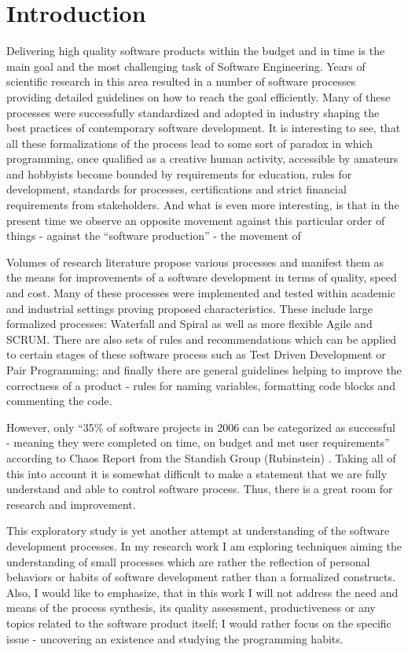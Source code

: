 \chapter{Introduction}
Delivering high quality software products within the budget and in time is the main goal and the most 
challenging task of Software Engineering. Years of scientific research in
this area resulted in a number of software processes providing detailed guidelines on how to reach 
the goal efficiently. Many of these processes were successfully standardized and adopted 
in industry shaping the best practices of contemporary software development. 
It is interesting to see, that all these formalizations of the process lead to some sort of paradox 
in which programming, once qualified as a creative human activity, accessible by amateurs 
and hobbyists become bounded by requirements for education, rules for development, standards for 
processes, certifications and strict financial requirements from stakeholders. And what is even more 
interesting, is that in the present time we observe an opposite movement against this particular order 
of things - against the ``software production'' - the movement of 

Volumes of research literature propose various processes and manifest them as the 
means for improvements of a software development in terms of quality, speed and cost. 
Many of these processes were implemented and tested within academic and industrial 
settings proving proposed characteristics. These include large formalized processes: 
Waterfall and Spiral as well as more flexible Agile and SCRUM. 
There are also sets of rules and recommendations which can be applied to certain 
stages of these software process such as Test Driven Development or Pair Programming; 
and finally there are general guidelines helping to improve the correctness of a 
product - rules for naming variables, formatting code blocks and commenting the code. 

However, only ``35\% of software projects in 2006 can be categorized as successful - meaning 
they were completed on time, on budget and met user requirements'' according to Chaos Report
from the Standish Group (Rubinstein) \cite{SDTimes}. Taking all of this into account it is 
somewhat difficult to make a statement that we are fully understand and able to control 
software process. Thus, there is a great room for research and improvement.

This exploratory study is yet another attempt at understanding of the software development processes. 
In my research work I am exploring techniques aiming the understanding of small processes which are 
rather the reflection of personal behaviors or habits of software development rather than a 
formalized constructs. Also, I would like to emphasize, that in this work I will not 
address the need and means of the process synthesis, its quality assessment, productiveness
or any topics related to the software product itself; I would rather focus on the specific issue - 
uncovering an existence and studying the programming habits. 

